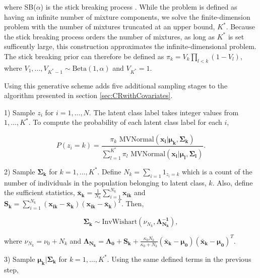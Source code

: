 \documentclass[
  12pt,
]{article}
\begin{document}
where SB(\(\alpha\)) is the stick breaking process
\citep{dunson_nonparametric_2009}. While the problem is defined as
having an infinite number of mixture components, we solve the
finite-dimension problem with the number of mixtures truncated at an
upper bound, \(K^*\). Because the stick breaking process orders the
number of mixtures, as long as \(K^*\) is set sufficently large, this
construction approximates the infinite-dimensional problem. The stick
breaking prior can therefore be defined as
\(\pi_k = V_k \prod_{l<k}(1-V_l)\), where
\(V_1, ..., V_{K^*-1} \sim \text{Beta}(1,\alpha)\) and \(V_{K^*}=1\).

Using this generative scheme adds five additional sampling stages to the
algorithm presented in section \ref{sec:CRwithCovariates}.

\begin{list}{}{}

\item[1)] Sample $z_i$ for $i=1,...,N$. The latent class label takes integer values from $1,...,K^*$.  To compute the probability of each latent class label for each $i$,

\begin{equation}
P(z_i=k) = \frac{\pi_k \text{ MVNormal}(\boldsymbol{x_i}|\boldsymbol{\mu_k},\boldsymbol{\Sigma_k})}{\sum_{l=1}^{K^*}\pi_l \text{ MVNormal}(\boldsymbol{x_i}|\boldsymbol{\mu_l},\boldsymbol{\Sigma_l})}.
\end{equation}

\item[2)] Sample $\boldsymbol{\Sigma_k}$ for $k=1,...,K^*$. Define $N_k=\sum_{i=1}1_{z_i=k}$ which is a count of the number of individuals in the population belonging to latent class, $k$.  Also, define the sufficient statistics, $\boldsymbol{\bar{x}_k}=\frac{1}{N_k}\sum_{i=1}^{N_k}\boldsymbol{x_{ik}}$ and $\boldsymbol{S_k} = \sum_{i=1}^{N_k}(\boldsymbol{x_{ik}}-\boldsymbol{\bar{x}_k})(\boldsymbol{x_{ik}}-\boldsymbol{\bar{x}_k})^T$.  Then,

\begin{equation}
\boldsymbol{\Sigma_k} \sim \text{InvWishart}(\nu_{N_k},\boldsymbol{\Lambda_{N_k}^{-1}}),
\end{equation}

where $\nu_{N_k} = \nu_{0}+N_k$ and $\boldsymbol{\Lambda_{N_k}}=\boldsymbol{\Lambda_{0}}+\boldsymbol{S_k}+\frac{\kappa_{0}N_k}{\kappa_{0}+N_k}(\boldsymbol{\bar{x}_k}-\boldsymbol{\mu_{0}})(\boldsymbol{\bar{x}_k}-\boldsymbol{\mu_{0}})^T$.

\item[3)] Sample $\boldsymbol{\mu_k|\Sigma_k}$ for $k=1,...,K^*$.  Using the same defined terms in the previous step,


\end{list}
\end{document}

